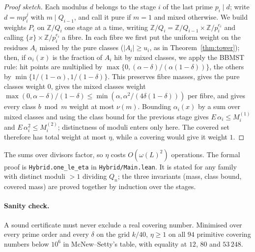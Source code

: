 \documentclass[11pt]{article}
\theoremstyle{definition}
\theoremstyle{remark}
\newcommand{\Z}{\mathbb{Z}}
\newcommand{\lean}[1]{\texttt{#1}}
\begin{document}
\begin{proof}[Proof sketch]
Each modulus $d$ belongs to the stage $i$ of the last prime $p_i \mid d$; write $d = m p_i^j$ with $m \mid Q_{i-1}$, and call it pure if $m = 1$ and mixed otherwise. We build weights $P_i$ on $\Z/Q_i$ one stage at a time, writing $\Z/Q_i = \Z/Q_{i-1}\times\Z/p_i^{e_i}$ and calling $\{x\}\times\Z/p_i^{e_i}$ a fibre. In each fibre we first put the uniform weight on the residues $A_i$ missed by the pure classes ($|A_i| \ge u_i$, as in Theorem~\ref{thm:tower}); then, if $\alpha_i(x)$ is the fraction of $A_i$ hit by mixed classes, we apply the BBMST rule: hit points are multiplied by $\max\{0, (\alpha-\delta)/(\alpha(1-\delta))\}$, the others by $\min\{1/(1-\alpha), 1/(1-\delta)\}$. This preserves fibre masses, gives the pure classes weight $0$, gives the mixed classes weight $\max(0, \alpha - \delta)/(1-\delta) \le \min(\alpha, \alpha^2/(4\delta(1-\delta)))$ per fibre, and gives every class $b \bmod m$ weight at most $\nu(m)$. Bounding $\alpha_i(x)$ by a sum over mixed classes and using the class bound for the previous stage gives $E\,\alpha_i \le M^{(1)}_i$ and $E\,\alpha_i^2 \le M^{(2)}_i$; distinctness of moduli enters only here. The covered set therefore has total weight at most $\eta$, while a covering would give it weight $1$.
\end{proof}

The sums over divisors factor, so $\eta$ costs $O(\omega(L)^2)$ operations. The formal proof is \lean{Hybrid.one\_le\_eta} in \lean{Hybrid/Main.lean}. It is stated for any family with distinct moduli $>1$ dividing $Q_n$; the three invariants (mass, class bound, covered mass) are proved together by induction over the stages.

\paragraph{Sanity check.} A sound certificate must never exclude a real covering number. Minimised over every prime order and every $\delta$ on the grid $k/40$, $\eta \ge 1$ on all $94$ primitive covering numbers below $10^6$ in McNew--Setty's table, with equality at $12$, $80$ and $53\,248$.
\end{document}
